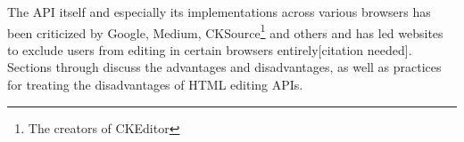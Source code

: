 The API itself and especially its implementations across various browsers has been criticized by Google\cite{bw}, Medium\cite{medium_ce_terrible}, CKSource\cite{bj}\footnote{The creators of CKEditor} and others and has led websites to exclude users from editing in certain browsers entirely[citation needed]. Sections  through  discuss the advantages and disadvantages, as well as practices for treating the disadvantages of HTML editing APIs.










